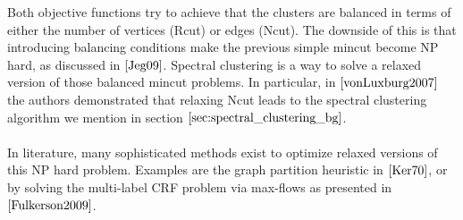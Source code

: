 Both objective functions try to achieve that the clusters are balanced in terms of either the number of vertices (Rcut) or edges (Ncut). The downside of this is that introducing balancing conditions make the previous simple mincut become NP hard, as discussed in $\cite{Jeg09}$. Spectral clustering is a way to solve a relaxed version of those balanced mincut problems. In particular, in $\cite{vonLuxburg2007}$ the authors demonstrated that relaxing Ncut leads to the spectral clustering algorithm we mention in section $\ref{sec:spectral_clustering_bg}$. \\ \\
In literature, many sophisticated methods exist to optimize relaxed versions of this NP hard problem. Examples are the graph partition heuristic in $\cite{Ker70}$, or by solving the multi-label CRF problem via max-flows as presented in $\cite{Fulkerson2009}$.

